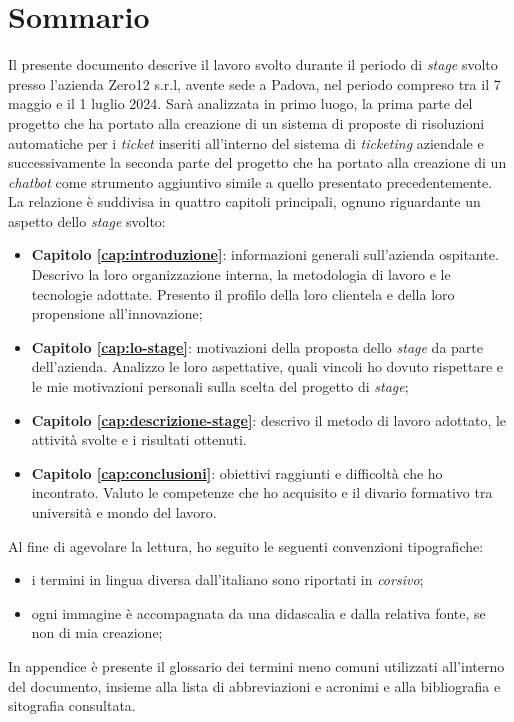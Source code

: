 \cleardoublepage
{}
{}
\begingroup
\let\clearpage\relax
\let\cleardoublepage\relax
\let\cleardoublepage\relax
\chapter*{Sommario}
Il presente documento descrive il lavoro svolto durante il periodo di \textit{stage} svolto presso l'azienda Zero12 s.r.l, avente sede a Padova, nel periodo compreso tra il 7 maggio e il 1 luglio 2024.
Sarà analizzata in primo luogo, la prima parte del progetto che ha portato alla creazione di un sistema di proposte di risoluzioni automatiche per i \textit{ticket} inseriti all'interno del sistema di \textit{ticketing} aziendale e successivamente la seconda parte del progetto che ha portato alla creazione di un \textit{chatbot} come strumento aggiuntivo simile a quello presentato precedentemente. \\
La relazione è suddivisa in quattro capitoli principali, ognuno riguardante un aspetto dello \textit{stage} svolto: 
\begin{itemize}
    \item \textbf{Capitolo \ref{cap:introduzione}}: informazioni generali sull'azienda ospitante. Descrivo la loro organizzazione interna, la metodologia di lavoro e le tecnologie adottate. Presento il profilo della loro clientela e della loro propensione all'innovazione;
    \item \textbf{Capitolo \ref{cap:lo-stage}}: motivazioni della proposta dello \textit{stage} da parte dell'azienda. Analizzo le loro aspettative, quali vincoli ho dovuto rispettare e le mie motivazioni personali sulla scelta del progetto di \textit{stage};
    \item \textbf{Capitolo \ref{cap:descrizione-stage}}: descrivo il metodo di lavoro adottato, le attività svolte e i risultati ottenuti. 
    \item \textbf{Capitolo \ref{cap:conclusioni}}: obiettivi raggiunti e difficoltà che ho incontrato. Valuto le competenze che ho acquisito e il divario formativo tra università e mondo del lavoro.
\end{itemize}
\noindent
Al fine di agevolare la lettura, ho seguito le seguenti convenzioni tipografiche:
\begin{itemize}
    \item i termini in lingua diversa dall'italiano sono riportati in \textit{corsivo};
    \item ogni immagine è accompagnata da una didascalia e dalla relativa fonte, se non di mia creazione;
\end{itemize}
\noindent
In appendice è presente il glossario dei termini meno comuni utilizzati all'interno del documento, insieme alla lista di abbreviazioni e acronimi e alla bibliografia e sitografia consultata.


\endgroup

\vfill
